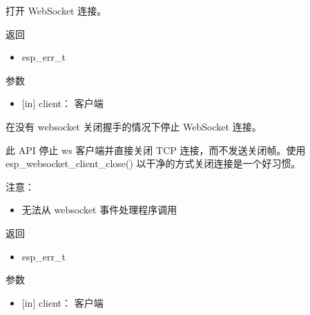 \documentclass[a4paper,12pt,english]{sphinxmanual}
\begin{document}
{{\sphinxAtStartPar
打开 WebSocket 连接。

\sphinxAtStartPar
返回
\begin{itemize}
\item {} 
\sphinxAtStartPar
esp\_err\_t

\end{itemize}

\sphinxAtStartPar
参数
\begin{itemize}
\item {} 
\sphinxAtStartPar
{[}in{]} client： 客户端

\end{itemize}

\begin{sphinxVerbatim}[commandchars=\\\{\}]
\end{sphinxVerbatim}

\sphinxAtStartPar
在没有 websocket 关闭握手的情况下停止 WebSocket 连接。

\sphinxAtStartPar
此 API 停止 ws 客户端并直接关闭 TCP 连接，而不发送关闭帧。使用 esp\_websocket\_client\_close() 以干净的方式关闭连接是一个好习惯。

\sphinxAtStartPar
注意：
\begin{itemize}
\item {} 
\sphinxAtStartPar
无法从 websocket 事件处理程序调用

\end{itemize}

\sphinxAtStartPar
返回
\begin{itemize}
\item {} 
\sphinxAtStartPar
esp\_err\_t

\end{itemize}

\sphinxAtStartPar
参数
\begin{itemize}
\item {} 
\sphinxAtStartPar
{[}in{]} client： 客户端

\end{itemize}

\begin{sphinxVerbatim}[commandchars=\\\{\}]
\end{sphinxVerbatim}

}}
\end{document}
